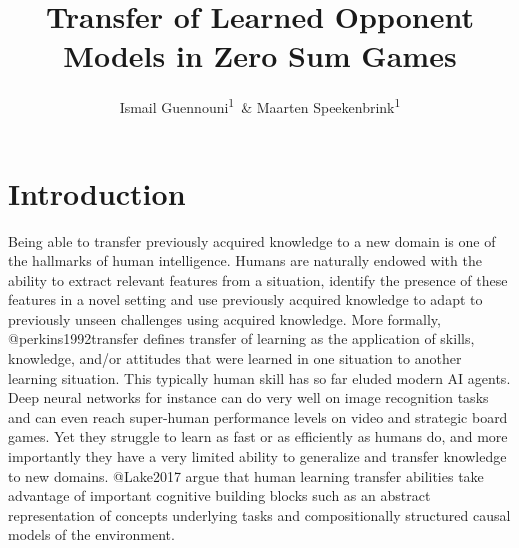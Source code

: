 \documentclass[man,floatsintext]{apa6}
\affiliation{
\vspace{0.5cm}
\textsuperscript{1} Department of Experimental Psychology, University College London}
\title{Transfer of Learned Opponent Models in Zero Sum Games}
\author{Ismail Guennouni\textsuperscript{1}~\& Maarten Speekenbrink\textsuperscript{1}}
\date{}
\begin{document}
\maketitle

\hypertarget{introduction}{%
\section{Introduction}\label{introduction}}

Being able to transfer previously acquired knowledge to a new domain is one of the hallmarks of human intelligence. Humans are naturally endowed with the ability to extract relevant features from a situation, identify the presence of these features in a novel setting and use previously acquired knowledge to adapt to previously unseen challenges using acquired knowledge. More formally, @perkins1992transfer defines transfer of learning as the application of skills, knowledge, and/or attitudes that were learned in one situation to another learning situation. This typically human skill has so far eluded modern AI agents. Deep neural networks for instance can do very well on image recognition tasks and can even reach super-human performance levels on video and strategic board games. Yet they struggle to learn as fast or as efficiently as humans do, and more importantly they have a very limited ability to generalize and transfer knowledge to new domains. @Lake2017 argue that human learning transfer abilities take advantage of important cognitive building blocks such as an abstract representation of concepts underlying tasks and compositionally structured causal models of the environment.
\end{document}
